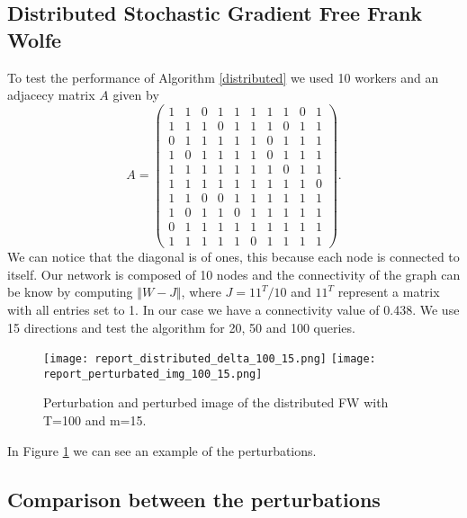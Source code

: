\subsection{Distributed Stochastic Gradient Free Frank Wolfe}
To test the performance of Algorithm \ref{distributed} we used 10 workers and an adjacecy matrix $A$ given by 
\[ A = 
\begin{pmatrix}
1& 1& 0& 1& 1& 1& 1& 1& 0& 1\\
1& 1& 1& 0& 1& 1& 1& 0& 1& 1\\
0& 1& 1& 1& 1& 1& 0& 1& 1& 1\\
1& 0& 1& 1& 1& 1& 0& 1& 1& 1\\
1& 1& 1& 1& 1& 1& 1& 0& 1& 1\\
1& 1& 1& 1& 1& 1& 1& 1& 1& 0\\
1& 1& 0& 0& 1& 1& 1& 1& 1& 1\\
1& 0& 1& 1& 0& 1& 1& 1& 1& 1\\
0& 1& 1& 1& 1& 1& 1& 1& 1& 1\\
1& 1& 1& 1& 1& 0& 1& 1& 1& 1	
\end{pmatrix}
.\]
We can notice that the diagonal is of ones, this because each node is connected to itself. Our network is composed of 10 nodes and the connectivity of the graph can be know by computing $\Vert W- J \Vert$, where $J= 11^T/10$ and $11^T$ represent a matrix with all entries set to 1. In our case we have a connectivity value of 0.438. We use 15 directions and test the algorithm for 20, 50 and 100 queries.

\begin{figure}[htbp]
	\centering
	\texttt{[image: report\_distributed\_delta\_100\_15.png]}\hfil
	\texttt{[image: report\_perturbated\_img\_100\_15.png]}
	\caption{Perturbation and perturbed image of the distributed FW with T=100 and m=15.}
	\label{fig:distributed_delta_50+20}
\end{figure}
In Figure \ref{fig:distributed_delta_50+20} we can see an example of the perturbations.
\subsection{Comparison between the perturbations}
